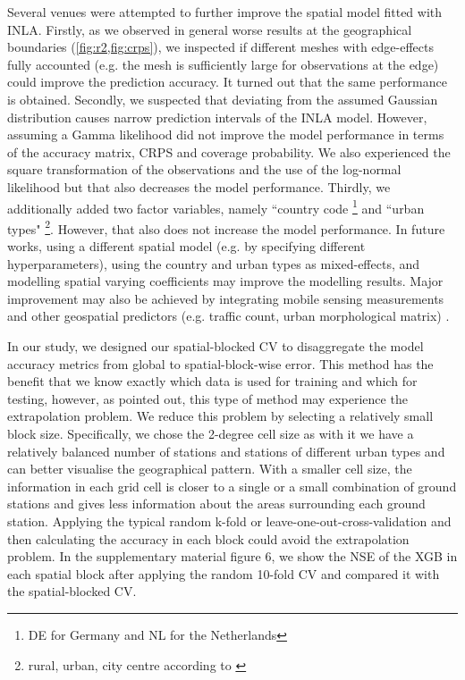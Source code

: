 \documentclass{article}
\begin{document}
Several venues were attempted to further improve the spatial model fitted with INLA. Firstly, as we observed in general worse results at the geographical boundaries (\cref{fig:r2,fig:crps}), we inspected if different meshes with edge-effects fully accounted (e.g. the mesh is sufficiently large for observations at the edge) could improve the prediction accuracy. It turned out that the same performance is obtained. Secondly, we suspected that deviating from the assumed Gaussian distribution causes narrow prediction intervals of the INLA model. However, assuming a Gamma likelihood did not improve the model performance in terms of the accuracy matrix, CRPS and coverage probability. We also experienced the square transformation of the observations and the use of the log-normal likelihood but that also decreases the model performance. Thirdly, we additionally added two factor variables, namely ``country code \footnote{DE for Germany and NL for the Netherlands} and ``urban types" \footnote{rural, urban, city centre according to \citep{urbantype}}. However, that also does not increase the model performance. In future works, using a different spatial model (e.g. by specifying different hyperparameters), using the country and urban types as mixed-effects, and modelling spatial varying coefficients may improve the modelling results. Major improvement may also be achieved by integrating mobile sensing measurements and other geospatial predictors (e.g. traffic count, urban morphological matrix) \citep{moragaetal17}.

 

In our study, we designed our spatial-blocked CV to disaggregate the model accuracy metrics from global to spatial-block-wise error. This method has the benefit that we know exactly which data is used for training and which for testing, however, as \cite{wadoux2021spatial} pointed out, this type of method may experience the extrapolation problem. We reduce this problem by selecting a relatively small block size. Specifically, we chose the 2-degree cell size as with it we have a relatively balanced number of stations and stations of different urban types and can better visualise the geographical pattern. With a smaller cell size, the information in each grid cell is closer to a single or a small combination of ground stations and gives less information about the areas surrounding each ground station. Applying the typical random k-fold or leave-one-out-cross-validation and then calculating the accuracy in each block could avoid the extrapolation problem. In the supplementary material figure 6, we show the NSE of the XGB in each spatial block after applying the random 10-fold CV and compared it with the spatial-blocked CV. 
 
\end{document}
